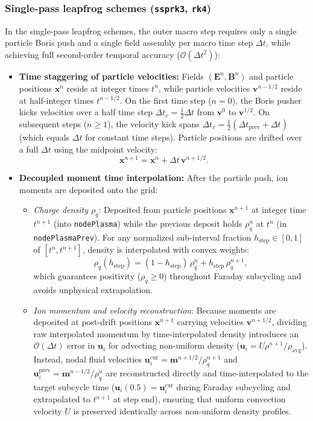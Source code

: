 \documentclass[a4paper, 11pt]{article}
\begin{document}
\subsubsection{Single-pass leapfrog schemes (\texttt{ssprk3}, \texttt{rk4})}
In the single-pass leapfrog schemes, the outer macro step requires only a single particle Boris push and a single field assembly per macro time step $\Delta t$, while achieving full second-order temporal accuracy ($\mathcal{O}(\Delta t^2)$):
\begin{itemize}
  \item \textbf{Time staggering of particle velocities:} Fields $(\mathbf{E}^n, \mathbf{B}^n)$ and particle positions $\mathbf{x}^n$ reside at integer times $t^n$, while particle velocities $\mathbf{v}^{n-1/2}$ reside at half-integer times $t^{n-1/2}$.
  On the first time step ($n = 0$), the Boris pusher kicks velocities over a half time step $\Delta t_v = \tfrac{1}{2}\Delta t$ from $\mathbf{v}^0$ to $\mathbf{v}^{1/2}$. On subsequent steps ($n \ge 1$), the velocity kick spans $\Delta t_v = \tfrac{1}{2}(\Delta t_{\text{prev}} + \Delta t)$ (which equals $\Delta t$ for constant time steps). Particle positions are drifted over a full $\Delta t$ using the midpoint velocity:
  \begin{equation}
  \mathbf{x}^{n+1} = \mathbf{x}^n + \Delta t\,\mathbf{v}^{n+1/2}.
  \end{equation}
  \item \textbf{Decoupled moment time interpolation:} After the particle push, ion moments are deposited onto the grid:
  \begin{itemize}
    \item \emph{Charge density $\rho_q$}: Deposited from particle positions $\mathbf{x}^{n+1}$ at integer time $t^{n+1}$ (into \texttt{nodePlasma}) while the previous deposit holds $\rho_q^n$ at $t^n$ (in \texttt{nodePlasmaPrev}). For any normalized sub-interval fraction $h_{\text{step}} \in [0, 1]$ of $[t^n, t^{n+1}]$, density is interpolated with convex weights:
    \begin{equation}
    \rho_q(h_{\text{step}}) = (1 - h_{\text{step}})\,\rho_q^n + h_{\text{step}}\,\rho_q^{n+1},
    \end{equation}
    which guarantees positivity ($\rho_q \ge 0$) throughout Faraday subcycling and avoids unphysical extrapolation.
    \item \emph{Ion momentum and velocity reconstruction}: Because moments are deposited at post-drift positions $\mathbf{x}^{n+1}$ carrying velocities $\mathbf{v}^{n+1/2}$, dividing raw interpolated momentum by time-interpolated density introduces an $\mathcal{O}(\Delta t)$ error in $\mathbf{u}_i$ for advecting non-uniform density ($\mathbf{u}_i = U \rho^{n+1} / \rho_{\text{avg}}$). Instead, nodal fluid velocities $\mathbf{u}_i^{\text{cur}} = \mathbf{m}^{n+1/2}/\rho_q^{n+1}$ and $\mathbf{u}_i^{\text{prev}} = \mathbf{m}^{n-1/2}/\rho_q^n$ are reconstructed directly and time-interpolated to the target subcycle time ($\mathbf{u}_i(0.5) = \mathbf{u}_i^{\text{cur}}$ during Faraday subcycling and extrapolated to $t^{n+1}$ at step end), ensuring that uniform convection velocity $U$ is preserved identically across non-uniform density profiles.

\end{itemize}
\end{itemize}
\end{document}
